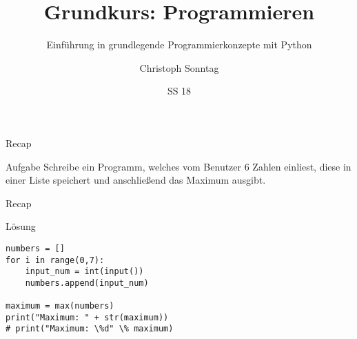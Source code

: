 \documentclass{beamer}
\title{Grundkurs: Programmieren}
\subtitle{Einführung in grundlegende Programmierkonzepte mit Python}
\date{SS 18}
\author[CS]{Christoph Sonntag}
\institute{Universität Passau}
\begin{document}
\maketitle














\begin{frame}{Recap}
    \begin{block}{Aufgabe}
        Schreibe ein Programm, welches vom Benutzer 6 Zahlen einliest, diese 
        in einer Liste speichert und anschließend das Maximum ausgibt.
    \end{block}
\end{frame}

\begin{frame}[fragile]{Recap}
    \begin{exampleblock}{Lösung}
        \begin{lstlisting}
numbers = []
for i in range(0,7):
    input_num = int(input())
    numbers.append(input_num)

maximum = max(numbers)
print("Maximum: " + str(maximum))
# print("Maximum: \%d" \% maximum)
        \end{lstlisting}
    \end{exampleblock}
\end{frame}







% 



\end{document}
